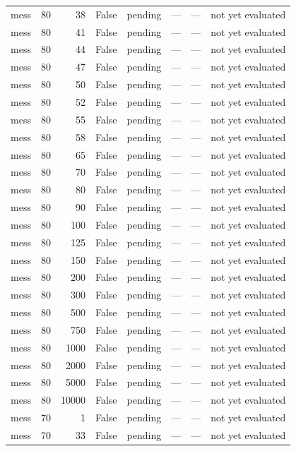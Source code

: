 \begin{tabular}{lrrrlrrl}
mess & 80 & 38 & False & pending & — & — & not yet evaluated \\
mess & 80 & 41 & False & pending & — & — & not yet evaluated \\
mess & 80 & 44 & False & pending & — & — & not yet evaluated \\
mess & 80 & 47 & False & pending & — & — & not yet evaluated \\
mess & 80 & 50 & False & pending & — & — & not yet evaluated \\
mess & 80 & 52 & False & pending & — & — & not yet evaluated \\
mess & 80 & 55 & False & pending & — & — & not yet evaluated \\
mess & 80 & 58 & False & pending & — & — & not yet evaluated \\
mess & 80 & 65 & False & pending & — & — & not yet evaluated \\
mess & 80 & 70 & False & pending & — & — & not yet evaluated \\
mess & 80 & 80 & False & pending & — & — & not yet evaluated \\
mess & 80 & 90 & False & pending & — & — & not yet evaluated \\
mess & 80 & 100 & False & pending & — & — & not yet evaluated \\
mess & 80 & 125 & False & pending & — & — & not yet evaluated \\
mess & 80 & 150 & False & pending & — & — & not yet evaluated \\
mess & 80 & 200 & False & pending & — & — & not yet evaluated \\
mess & 80 & 300 & False & pending & — & — & not yet evaluated \\
mess & 80 & 500 & False & pending & — & — & not yet evaluated \\
mess & 80 & 750 & False & pending & — & — & not yet evaluated \\
mess & 80 & 1000 & False & pending & — & — & not yet evaluated \\
mess & 80 & 2000 & False & pending & — & — & not yet evaluated \\
mess & 80 & 5000 & False & pending & — & — & not yet evaluated \\
mess & 80 & 10000 & False & pending & — & — & not yet evaluated \\
mess & 70 & 1 & False & pending & — & — & not yet evaluated \\
mess & 70 & 33 & False & pending & — & — & not yet evaluated \\

\end{tabular}
